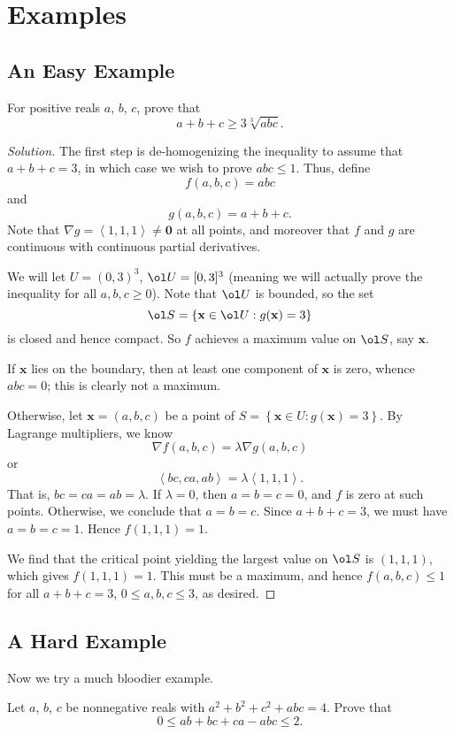 \documentclass[11pt]{scrartcl}
\begin{document}
\section{Examples}
\subsection{An Easy Example}
\begin{example}
  [AM-GM] For positive reals $a$, $b$, $c$, prove that
  \[ a+b+c \ge 3\sqrt[3]{abc}. \]
\end{example}
\begin{proof}[Solution]
  The first step is de-homogenizing the inequality
  to assume that $a+b+c=3$,
  in which case we wish to prove $abc \le 1$.
  Thus, define
  \[ f(a,b,c) = abc \]
  and
  \[ g(a,b,c) = a+b+c. \]
  Note that $\nabla g = \left<1,1,1\right> \neq \mathbf 0$
  at all points, and moreover that $f$ and $g$ are continuous
  with continuous partial derivatives.

  We will let $U = (0,3)^3$, $\ol U = [0,3]^3$
  (meaning we will actually prove the inequality
  for all $a,b,c \ge 0$).
  Note that $\ol U$ is bounded, so the set
  \[ \ol S = \left\{ \mathbf x \in \ol U : g(\mathbf x) = 3 \right\} \]
  is closed and hence compact.
  So $f$ achieves a maximum value on $\ol S$, say $\mathbf x$.

  If $\mathbf x$ lies on the boundary,
  then at least one component of $\mathbf x$ is zero,
  whence $abc = 0$; this is clearly not a maximum.

  Otherwise, let $\mathbf x = (a,b,c)$ be a point of
  $S = \left\{ \mathbf x \in U : g(\mathbf x) = 3 \right\}$.
  By Lagrange multipliers, we know
  \[ \nabla f(a,b,c) = \lambda \nabla g(a,b,c) \]
  or
  \[ \left< bc, ca, ab \right> = \lambda \left<1,1,1\right>. \]
  That is, $bc = ca = ab = \lambda$.
  If $\lambda = 0$, then $a=b=c=0$, and $f$ is zero at such points.
  Otherwise, we conclude that $a=b=c$.
  Since $a+b+c=3$, we must have $a=b=c=1$.
  Hence $f(1,1,1) = 1$.

  We find that the critical point yielding the largest value
  on $\ol S$ is $(1,1,1)$, which gives $f(1,1,1) = 1$.
  This must be a maximum, and hence $f(a,b,c) \le 1$
  for all $a+b+c=3$, $0 \le a,b,c \le 3$, as desired.
\end{proof}

\subsection{A Hard Example}
Now we try a much bloodier example.
\begin{example}
  [USAMO 2001/3] Let $a$, $b$, $c$ be nonnegative
  reals with $a^2+b^2+c^2+abc=4$.
  Prove that
  \[ 0 \le ab + bc + ca - abc \le 2. \]
\end{example}
\end{document}
